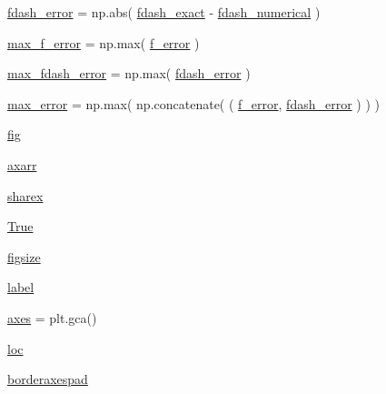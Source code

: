\begin{DoxyCompactItemize}
\item 
\hyperlink{namespaceNonlinear__ODE__BVP__plot_a692d79c4c51e088bd93da3ba048a4e9d}{fdash\+\_\+error} = np.\+abs( \hyperlink{namespaceNonlinear__ODE__BVP__plot_a7812be90d09cb7b6be00e129f91acd36}{fdash\+\_\+exact} -\/ \hyperlink{namespaceNonlinear__ODE__BVP__plot_a6439d7324acb06f63f8c18c171103032}{fdash\+\_\+numerical} )
\item 
\hyperlink{namespaceNonlinear__ODE__BVP__plot_a8bbab15aae55f65abcc2f4af0d72fd31}{max\+\_\+f\+\_\+error} = np.\+max( \hyperlink{namespaceNonlinear__ODE__BVP__plot_ac170b8ff53c4176fbe06ac0cc7b2f211}{f\+\_\+error} )
\item 
\hyperlink{namespaceNonlinear__ODE__BVP__plot_a9ca20ba345ebe718b33e7a64f2d2e615}{max\+\_\+fdash\+\_\+error} = np.\+max( \hyperlink{namespaceNonlinear__ODE__BVP__plot_a692d79c4c51e088bd93da3ba048a4e9d}{fdash\+\_\+error} )
\item 
\hyperlink{namespaceNonlinear__ODE__BVP__plot_ae862a80437e752743596a018fc0de10e}{max\+\_\+error} = np.\+max( np.\+concatenate( ( \hyperlink{namespaceNonlinear__ODE__BVP__plot_ac170b8ff53c4176fbe06ac0cc7b2f211}{f\+\_\+error}, \hyperlink{namespaceNonlinear__ODE__BVP__plot_a692d79c4c51e088bd93da3ba048a4e9d}{fdash\+\_\+error} ) ) )
\item 
\hyperlink{namespaceNonlinear__ODE__BVP__plot_ab3a246629018cd1ea6b16f5b0504b6e6}{fig}
\item 
\hyperlink{namespaceNonlinear__ODE__BVP__plot_a229f79193f97241b4350ee9a861239d3}{axarr}
\item 
\hyperlink{namespaceNonlinear__ODE__BVP__plot_a730ee676ba4477a0b19e22a6c3f9eec7}{sharex}
\item 
\hyperlink{namespaceNonlinear__ODE__BVP__plot_a4bb495536c68560721007d6b84153254}{True}
\item 
\hyperlink{namespaceNonlinear__ODE__BVP__plot_af97d915da4212b8f6e2f6797c8df1e64}{figsize}
\item 
\hyperlink{namespaceNonlinear__ODE__BVP__plot_afcf13e24098d63ea34ff9f3c801248c8}{label}
\item 
\hyperlink{namespaceNonlinear__ODE__BVP__plot_a5ddc537c2f0bd93a57f2c12bea54675e}{axes} = plt.\+gca()
\item 
\hyperlink{namespaceNonlinear__ODE__BVP__plot_ae2778ff34d84d599493b00dc7ec51d5a}{loc}
\item 
\hyperlink{namespaceNonlinear__ODE__BVP__plot_a1bb6bec323b7d66eac55f5a6f51429e6}{borderaxespad}
\end{DoxyCompactItemize}


